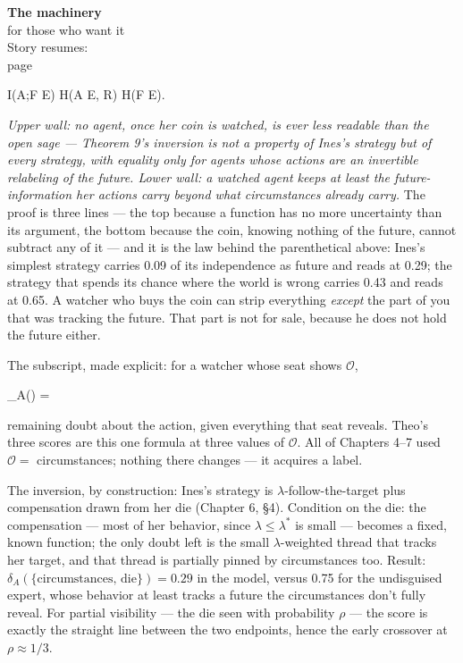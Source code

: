 \begin{machinery}{\textbf{The machinery}\\for those who want it\\[3pt]{\color{muted}Story resumes:\\page~\pageref{ch9}}}
\begin{dispmath}I(A;F \mid E) \;\le\; H(A \mid E, R) \;\le\; H(F \mid E).\end{dispmath}

\noindent \emph{Upper wall: no agent, once her coin is watched, is ever less readable
than the open sage --- Theorem 9's inversion is not a property of Ines's
strategy but of every strategy, with equality only for agents whose
actions are an invertible relabeling of the future. Lower wall: a
watched agent keeps at least the future-information her actions carry
beyond what circumstances already carry.} The proof is three lines ---
the top because a function has no more uncertainty than its argument,
the bottom because the coin, knowing nothing of the future, cannot
subtract any of it --- and it is the law behind the parenthetical above:
Ines's simplest strategy carries 0.09 of its independence as future
and reads at 0.29; the strategy that spends its chance where the world
is wrong carries 0.43 and reads at 0.65. A watcher who buys the coin
can strip everything \emph{except} the part of you that was tracking the
future. That part is not for sale, because he does not hold the future
either.


The subscript, made explicit: for a watcher whose seat shows \(\mathcal{O}\),

\begin{dispmath}\delta_A() =  \;\;\text{---}\end{dispmath}

\noindent remaining doubt about the action, given everything that seat reveals.
Theo's three scores are this one formula at three values of \(\mathcal{O}\). All of Chapters 4--7 used \(\mathcal{O} =\) circumstances; nothing there changes --- it
acquires a label.

The inversion, by construction: Ines's strategy is \(\lambda\)-follow-the-target
plus compensation drawn from her die (Chapter 6, §4). Condition on the
die: the compensation --- most of her behavior, since \(\lambda \le \lambda^{\ast}\) is small ---
becomes a fixed, known function; the only doubt left is the small
\(\lambda\)-weighted thread that tracks her target, and that thread is partially
pinned by circumstances too. Result: \(\delta_A(\{\text{circumstances, die}\}) = 0.29\)
in the model, versus 0.75 for the undisguised expert, whose behavior
at least tracks a future the circumstances don't fully reveal.
For partial visibility --- the die seen with probability \(\rho\) --- the score
is exactly the straight line between the two endpoints, hence the
early crossover at \(\rho \approx 1/3\).


\end{machinery}
